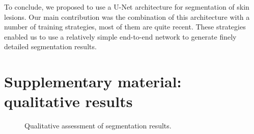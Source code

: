 \documentclass{article}
\begin{document}
To conclude, we proposed to use a U-Net architecture for
segmentation of skin lesions. Our main contribution was the
combination of this architecture with a number of
training strategies, most of them are quite recent. These strategies
enabled us to use a relatively simple end-to-end network to generate
finely detailed segmentation results.

\medskip

\small

% 


\clearpage
\section{Supplementary material: qualitative results}
\begin{figure}[hbt]
\centering
{}\hfil
{}
\caption{Qualitative assessment of segmentation results.}\label{result_samples}
\end{figure}
\end{document}
